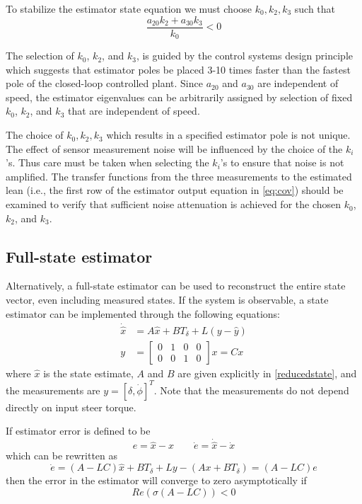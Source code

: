 \documentclass[letterpaper,11pt]{article}
\begin{document}
To stabilize the estimator state equation we must choose $k_0, k_2, k_3$ such
that
\begin{equation*}
\frac{a_{20} k_{2} + a_{30} k_{3}}{k_{0}} < 0
\end{equation*}

The selection of $k_0$, $k_2$, and $k_3$, is guided by the control systems
design principle which suggests that estimator poles be placed 3-10 times faster
than the fastest pole of the closed-loop controlled plant. Since $a_{20}$ and $a_{30}$ are
independent of speed, the estimator eigenvalues can be arbitrarily assigned by
selection of fixed $k_0$, $k_2$, and $k_3$ that are independent of speed.

The choice of $k_0, k_2, k_3$ which results in a specified estimator pole is
not unique. The effect of sensor measurement noise will be influenced by the
choice of the $k_i$'s. Thus care must be taken when selecting the $k_i$'s to ensure
that noise is not amplified. The transfer functions from the three measurements to
the estimated lean (i.e., the first row of the estimator output equation in
\autoref{eq:cov}) should be examined to verify that sufficient noise
attenuation is achieved for the chosen $k_0$, $k_2$, and $k_3$.

\subsection{Full-state estimator} \label{fullstate}
Alternatively, a full-state estimator can be used to reconstruct the entire
state vector, even including measured states. If the system is observable, a state
estimator can be implemented through the following equations:
\begin{align*}
\dot{\hat{x}} &= A \hat{x} + B T_\delta + L \left(y - \hat{y}\right) \\
y &= \left[\begin{smallmatrix}0 & 1 & 0 & 0\\0 & 0 & 1 & 0\end{smallmatrix}\right] x = C x
\end{align*}
where $\hat{x}$ is the state estimate, $A$ and $B$ are given explicitly in
\autoref{reducedstate}, and the measurements are $y = \left[\delta,
\dot{\phi}\right]^T$.  Note that the measurements do not depend directly on
input steer torque.

If estimator error is defined to be
\begin{equation*}
e = \hat{x} - x
\qquad
\dot{e} = \dot{\hat{x}} - \dot{x}
\end{equation*}
which can be rewritten as
\begin{equation*}
\dot{e} = \left(A - LC\right) \hat{x} + B T_\delta + L y - \left(A x + B T_\delta\right)
= \left(A - LC\right) e
\end{equation*}
then the error in the estimator will converge to zero asymptotically if
\begin{equation*}
Re\left(\sigma\left(A - LC\right)\right) < 0
\end{equation*}
\end{document}
